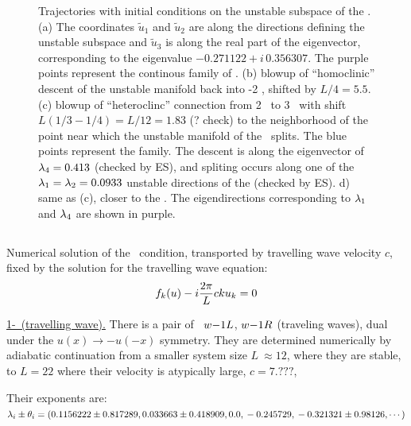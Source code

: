 \begin{figure}[h]
\caption{
 Trajectories with initial conditions on the unstable subspace of
 the  {\eqva}.  
 (a) The coordinates $\tilde{u}_1$ and $\tilde{u}_2$ are along the directions defining the unstable subspace
 and $\tilde{u}_3$  is along the real part of the eigenvector, 
 corresponding to the eigenvalue $-0.271122+ i\, 0.356307$. The purple points represent the continous family
 of 
 \eqva.
(b) blowup of ``homoclinic'' descent of the unstable manifold
back into {\nameit}-2 {\eqv}, shifted by
$L/4 =5.5$.
(c) blowup of ``heteroclinc'' connection from 
{\nameit}2 \eqv\ to {\nameit}3 \eqv\, with shift 
$L(1/3-1/4) = L/12 = 1.83$ (? check)
to the neighborhood of the point near which the
unstable manifold of the 
 \eqv\ splits. The blue points
represent the 
 {\eqv} family.
The descent is along the eigenvector of $\lambda_4= 0.413$ (checked by ES),
and spliting
occurs along one of the 
$\lambda_1=\lambda_2=0.0933$
unstable directions of the  {\eqv} (checked by ES).
d) same as (c), closer to the  {\eqv}. The eigendirections corresponding to $\lambda_1$
and $\lambda_4$ are shown in purple. 
}
\label{f:neighborhood2w}
\end{figure}


\subsection{\Reqva}

Numerical solution of the \reqv\  condition,
transported by travelling wave velocity $c$, 
fixed by the solution for the travelling wave equation:
\[
f_k(u) - i{2\pi\over L} c k u_k = 0
\]

\underline{1-\reqv\  (travelling wave).}
There is a pair of \reqva\ 
${w-}1L$,
${w-}1R$
(traveling waves), dual under the
$u(x) \to -u(-x)$ symmetry. They are 
determined numerically by 
adiabatic continuation from a smaller system size
$L~\approx 12$,
where they are stable, to $L=22$
where their velocity is atypically large, $c=7.???$,

Their exponents are:
\\
$\lambda_i \pm \theta_i =
(
\\
  0.1156222 \pm 0.817289,	\\
  0.033663 \pm 0.418909,	\\
 0.0                    ,	\\
 -0.245729                    ,	\\
 -0.321321 \pm 0.98126,
\cdots
)$

